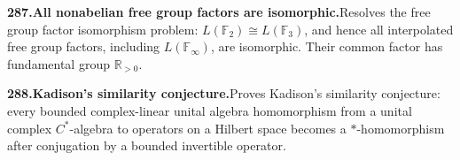 \documentclass[11pt,a4paper]{article}
\begin{document}
  \par \begin{minipage}{\linewidth}
  \fontsize{10.5}{12.6}\selectfont\RaggedRight
  \hypertarget{result 287}{}
  {\bfseries\textcolor{muted}{287.}\enspace All nonabelian free group factors are isomorphic.}\enspace Resolves the free group factor isomorphism problem: $L(\mathbb F_2)\cong L(\mathbb F_3)$, and hence all interpolated free group factors, including $L(\mathbb F_\infty)$, are isomorphic. Their common factor has fundamental group $\mathbb R_{>0}$.\par
  \end{minipage}\par\vspace{5pt}



  \par \begin{minipage}{\linewidth}
  \fontsize{10.5}{12.6}\selectfont\RaggedRight
  \hypertarget{result 288}{}
  {\bfseries\textcolor{muted}{288.}\enspace Kadison's similarity conjecture.}\enspace Proves Kadison's similarity conjecture: every bounded complex-linear unital algebra homomorphism from a unital complex $C^*$-algebra to operators on a Hilbert space becomes a $*$-homomorphism after conjugation by a bounded invertible operator.\par
  \end{minipage}\par\vspace{5pt}
\end{document}
